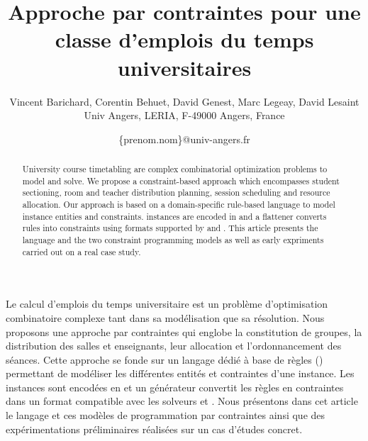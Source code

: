 \documentclass[french]{pfia}
\title{\textbf{Approche par contraintes pour une classe d'emplois du temps universitaires}}
\author{Vincent Barichard, Corentin Behuet, David Genest, Marc Legeay, David Lesaint\\[6pt]
\fup{1} Univ Angers, LERIA, F-49000 Angers, France \\
}
\date{
\{prenom.nom\}@univ-angers.fr
}
\newcommand{\davidl}[1]{\todo[inline,color=yellow!40]{#1}}
\begin{document}
\maketitle


\begin{resume}
Le calcul d'emplois du temps universitaire est un problème d'optimisation combinatoire complexe tant dans sa modélisation que sa résolution.
Nous proposons une approche par contraintes qui englobe la constitution de groupes, la distribution des salles et enseignants, leur allocation et l'ordonnancement des séances.
Cette approche se fonde sur un langage dédié à base de règles ({\UTP}) 
permettant de modéliser les différentes entités et contraintes d'une instance.
Les instances \UTP{} sont encodées en \XML{} et un générateur convertit les règles en contraintes dans un format %
compatible avec les solveurs \MINIZINC{} et \CHRPP{}.
Nous présentons dans cet article le langage {\UTP} et ces modèles de programmation par contraintes ainsi que des expérimentations préliminaires réalisées sur un cas d'études concret.
%
\end{resume}


\begin{abstract}
University course timetabling are complex combinatorial optimization problems to model and solve.
We propose a constraint-based approach which encompasses student sectioning, room and teacher distribution planning, session scheduling and resource allocation.
Our approach is based on a domain-specific rule-based language {\UTP} to model instance entities and constraints.
{\UTP} instances are encoded in {\XML} and a flattener converts rules into constraints using formats supported by \MINIZINC{} and \CHR{}.
This article presents the {\UTP} language and the two constraint programming models as well as early expriments carried out on a real case study. 
\end{abstract}
\end{document}

